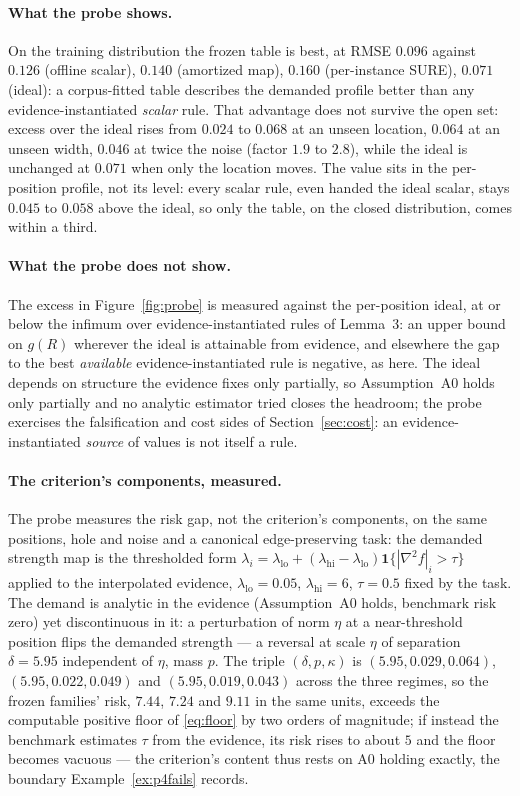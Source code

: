 \paragraph{What the probe shows.} On the training distribution the frozen table is best, at RMSE $0.096$ against $0.126$ (offline scalar), $0.140$ (amortized map), $0.160$ (per-instance SURE), $0.071$ (ideal): a corpus-fitted table describes the demanded profile better than any evidence-instantiated \emph{scalar} rule. That advantage does not survive the open set: excess over the ideal rises from $0.024$ to $0.068$ at an unseen location, $0.064$ at an unseen width, $0.046$ at twice the noise (factor $1.9$ to $2.8$), while the ideal is unchanged at $0.071$ when only the location moves. The value sits in the per-position profile, not its level: every scalar rule, even handed the ideal scalar, stays $0.045$ to $0.058$ above the ideal, so only the table, on the closed distribution, comes within a third.

\paragraph{What the probe does not show.} The excess in Figure~\ref{fig:probe} is measured against the per-position ideal, at or below the infimum over evidence-instantiated rules of Lemma~3: an upper bound on $g(R)$ wherever the ideal is attainable from evidence, and elsewhere the gap to the best \emph{available} evidence-instantiated rule is negative, as here. The ideal depends on structure the evidence fixes only partially, so Assumption~A0 holds only partially and no analytic estimator tried closes the headroom; the probe exercises the falsification and cost sides of Section~\ref{sec:cost}: an evidence-instantiated \emph{source} of values is not itself a rule.

\paragraph{The criterion's components, measured.} The probe measures the risk gap, not the criterion's components, on the same positions, hole and noise and a canonical edge-preserving task: the demanded strength map is the thresholded form $\lambda_i = \lambda_{\mathrm{lo}} + (\lambda_{\mathrm{hi}} - \lambda_{\mathrm{lo}}) \mathbf{1}\{ |\nabla^2 f|_i > \tau \}$ applied to the interpolated evidence, $\lambda_{\mathrm{lo}} = 0.05$, $\lambda_{\mathrm{hi}} = 6$, $\tau = 0.5$ fixed by the task. The demand is analytic in the evidence (Assumption~A0 holds, benchmark risk zero) yet discontinuous in it: a perturbation of norm $\eta$ at a near-threshold position flips the demanded strength --- a reversal at scale $\eta$ of separation $\delta = 5.95$ independent of $\eta$, mass $p$. The triple $(\delta,p,\kappa)$ is $(5.95,0.029,0.064)$, $(5.95,0.022,0.049)$ and $(5.95,0.019,0.043)$ across the three regimes, so the frozen families' risk, $7.44$, $7.24$ and $9.11$ in the same units, exceeds the computable positive floor of \eqref{eq:floor} by two orders of magnitude; if instead the benchmark estimates $\tau$ from the evidence, its risk rises to about $5$ and the floor becomes vacuous --- the criterion's content thus rests on A0 holding exactly, the boundary Example~\ref{ex:p4fails} records.

